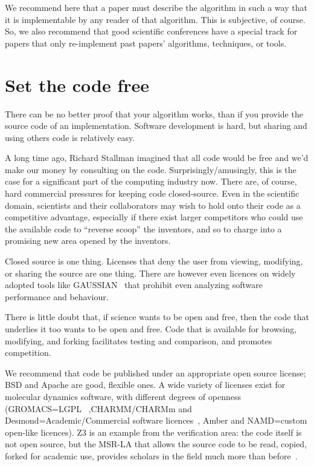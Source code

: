 \documentclass[conference]{IEEEtran}
\begin{document}
We recommend here that a paper must describe the algorithm in such a
way that it is implementable by any reader of that algorithm. This is
subjective, of course. So, we also recommend that good scientific
conferences have a special track for papers that only re-implement
past papers' algorithms, techniques, or tools.


\section{Set the code free} 

There can be no better proof that your algorithm works, than if you
provide the source code of an implementation. Software development is
hard, but sharing and using others code is relatively easy.

A long time ago, Richard Stallman imagined that all code would be free
and we'd make our money by consulting on the code.
Surprisingly/amusingly, this is the case for a significant part of the
computing industry now. There are, of course, hard commercial
pressures for keeping code closed-source. Even in the scientific
domain, scientists and their collaborators may wish to hold onto their
code as a competitive advantage, especially if there exist larger
competitors who could use the available code to ``reverse scoop'' the
inventors, and so to charge into a promising new area opened by the
inventors.

Closed source is one thing. Licenses that deny the user from viewing,
modifying, or sharing the source are one thing. There are however even
licences on widely adopted tools like GAUSSIAN~\cite{Giles2004} that
prohibit even analyzing software performance and behaviour.
 
There is little doubt that, if science wants to be open and free,
then the code that underlies it too wants to be open and free. Code
that is available for browsing, modifying, and forking facilitates
testing and comparison, and promotes competition.

We recommend that code be published under an appropriate open source
license; BSD and Apache are good, flexible ones.%
A wide
variety of licenses exist for molecular dynamics software, with
different degrees of openness (GROMACS=LGPL~\cite{Hess2008}
,CHARMM/CHARMm and Desmond=Academic/Commercial software
licences~\cite{Brooks2009,Bowers2006}, Amber and NAMD=custom open-like
licences). Z3 is an example from the verification area: the code itself
is not open source, but the MSR-LA that allows the source code to be
read, copied, forked for academic use, provides scholars in the field
much more than before~\cite{deMoura2012Z3open}.
\end{document}
